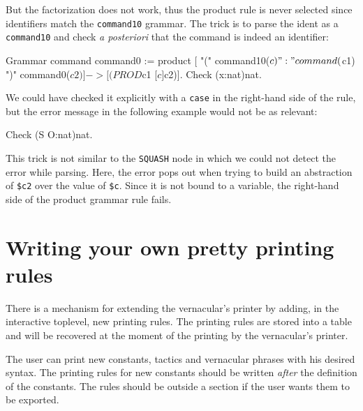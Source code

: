 
But the factorization does not work, thus the product rule is never
selected since identifiers match the {\tt command10} grammar. The
trick is to parse the ident as a {\tt command10} and check \emph{a
posteriori} that the command is indeed an identifier:

\begin{coq_example}
Grammar command command0 :=
  product [ "(" command10($c) ":" command($c1) ")" command0($c2) ] ->
            [(PROD $c1 [$c]$c2)].
Check (x:nat)nat.
\end{coq_example}

\noindent We could have checked it explicitly with a {\tt case} in
the right-hand side of the rule, but the error message in the
following example would not be as relevant:

\begin{coq_example}
Check (S O:nat)nat.
\end{coq_example}

\noindent This trick is not similar to the {\tt SQUASH} node in which
we could not detect the error while parsing. Here, the error pops out
when trying to build an abstraction of {\tt\$c2} over the value of
{\tt\$c}. Since it is not bound to a variable, the right-hand side of
the product grammar rule fails.
 
\section{Writing your own pretty printing rules}
\label{Syntax}

There is a mechanism for extending the
vernacular's printer by adding, in the interactive
toplevel, new printing rules.  The printing rules are stored into a
table and will be recovered at the moment of the printing by the
vernacular's printer.

The user can print new constants, tactics and vernacular phrases
with his desired syntax.  The printing rules
for new constants should be written {\em after} the definition of the
constants. The rules should be
outside a section if the user wants them to be exported.

